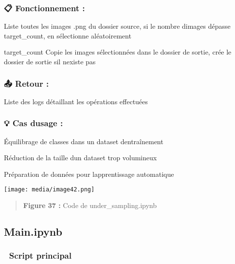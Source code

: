 \subsubsection[📋 \textbf{Fonctionnement
:}]{\texorpdfstring{\protect\hypertarget{anchor-63}{}{}📋
\textbf{Fonctionnement :}}{📋 Fonctionnement :}}\label{fonctionnement}

Liste toutes les images .png du dossier source, si le nombre
d\textquotesingle images dépasse target\_count, en sélectionne
aléatoirement

target\_count Copie les images sélectionnées dans le dossier de sortie,
crée le dossier de sortie s\textquotesingle il n\textquotesingle existe
pas

\subsubsection[📤 \textbf{Retour
:}]{\texorpdfstring{\protect\hypertarget{anchor-64}{}{}📤 \textbf{Retour
:}}{📤 Retour :}}\label{retour}

Liste des logs détaillant les opérations effectuées

\subsubsection[💡\textbf{ Cas d\textquotesingle usage
:}]{\texorpdfstring{\protect\hypertarget{anchor-65}{}{}💡\textbf{ Cas
d\textquotesingle usage
:}}{💡 Cas d\textquotesingle usage :}}\label{cas-dusage}

Équilibrage de classes dans un dataset d\textquotesingle entraînement

Réduction de la taille d\textquotesingle un dataset trop volumineux

Préparation de données pour l\textquotesingle apprentissage automatique

\texttt{[image: media/image42.png]}

\begin{quote}
\textbf{Figure 37 : }Code de under\_sampling.ipynb
\end{quote}

\subsection[Main.ipynb]{\texorpdfstring{\protect\hypertarget{anchor-66}{}{}Main.ipynb}{Main.ipynb}}\label{main.ipynb}

\subsubsection[🔄 \textbf{Script
principal}]{\texorpdfstring{\protect\hypertarget{anchor-67}{}{}🔄
\textbf{Script principal}}{🔄 Script principal}}\label{script-principal}

